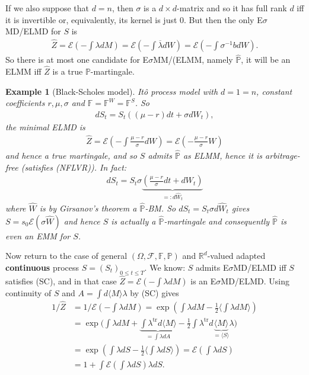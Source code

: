 \documentclass[12pt,a4paper, twoside]{article}
\newtheorem{exmp}{Example}[section]
\theoremstyle{definition}
\newcommand{\PP}{\mathbb{P}} %
\begin{document}
If we also suppose that $d=n$, then $\sigma$ is a $d \times d$-matrix and so it has full rank $d$ iff it is invertible or, equivalently, its kernel is just $0$. But then the only E$\sigma$MD/ELMD for $S$ is 
\begin{align*}
\hat{Z}= \mathcal{E} \left( - \int \lambda dM \right) = \mathcal{E}\left( - \int \overline{\lambda}dW \right) = \mathcal{E} \left( - \int \sigma^{-1} b dW \right). 
\end{align*}
So there is at most one candidate for E$\sigma$MM/(ELMM, namely $\hat{\PP}$, it will be an ELMM iff $\hat{Z}$ is a true $\PP$-martingale. 
\begin{exmp}[Black-Scholes model] Itô process model with $d=1=n$, constant coefficients $r, \mu, \sigma$ and $\mathbb{F}= \mathbb{F}^W= \mathbb{F}^S$. So 
\begin{align*}
dS_t = S_t(( \mu-r)dt + \sigma dW_t),
\end{align*}
the minimal ELMD is \begin{align*}
\hat{Z}= \mathcal{E}\left( - \int \frac{\mu-r}{\sigma}dW \right) = \mathcal{E} \left( - \frac{\mu-r}{\sigma}W \right)
\end{align*}
and hence a true martingale, and so $S$ admits $\hat{\PP}$ as ELMM, hence it is arbitrage-free (satisfies (NFLVR)). In fact: 
\begin{align*}
dS_t = S_t \sigma \underbrace{\left( \frac{\mu-r}{\sigma}dt + dW_t \right)}_{=: d \widehat{W}_t}
\end{align*}
where $\widehat{W}$ is by Girsanov's theorem a $\hat{\PP}$-BM. So $dS_t= S_t \sigma d\widehat{W}_t$ gives $S= s_0 \mathcal{E}( \sigma \widehat{W})$ and hence $S$ is actually a $\hat{\PP}$-martingale and consequently $\hat{\PP}$ is even an EMM for $S$. 
\end{exmp}
\newpage
Now return to the case of general $( \Omega, \mathcal{F}, \mathbb{F}, \PP)$ and $\mathbb{R}^d$-valued adapted \textbf{continuous} process $S=(S_t)_{0 \leq t \leq T}$. We know: $S$ admits E$\sigma$MD/ELMD iff $S$ satisfies (SC), and in that case $\hat{Z}= \mathcal{E}( - \int \lambda dM)$ is an E$\sigma$MD/ELMD. Using continuity of $S$ and $A= \int d \langle M \rangle \lambda$ by (SC) gives 
\begin{align*}
1/ \hat{Z}&= 1/ \mathcal{E} \left( - \int \lambda dM \right) = \exp \left( \int \lambda dM - \frac{1}{2} \langle \int \lambda dM \rangle \right) \\
&= \exp \Big( \int \lambda dM + \underbrace{\int \lambda^\text{tr}d \langle M \rangle}_{= \int \lambda dA} - \frac{1}{2} \int \lambda^\text{tr} d \underbrace{\langle M \rangle}_{= \langle S \rangle} \lambda \Big) \\
& =\exp \left( \int \lambda dS - \frac{1}{2} \langle \int \lambda dS \rangle \right) = \mathcal{E}\left( \int \lambda dS \right) \\
&= 1 + \int \mathcal{E} \left( \int \lambda dS \right) \lambda dS.
\end{align*}
\end{document}
